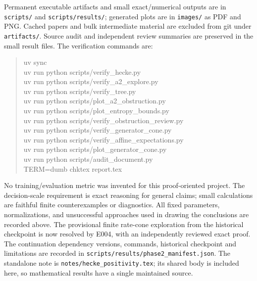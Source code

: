 \documentclass[11pt]{article}
\theoremstyle{remark}\newtheorem{remark}[definition]{Remark}
\begin{document}
Permanent executable artifacts and small exact/numerical outputs are in
\texttt{scripts/} and \texttt{scripts/results/}; generated plots are in
\texttt{images/} as PDF and PNG. Cached papers and bulk intermediate
material are excluded from git under \texttt{artifacts/}. Source audit and
independent review summaries are preserved in the small result files.
The verification commands are:
\begin{quote}\small\ttfamily
uv sync\\
uv run python scripts/verify\_hecke.py\\
uv run python scripts/verify\_a2\_explore.py\\
uv run python scripts/verify\_tree.py\\
uv run python scripts/plot\_a2\_obstruction.py\\
uv run python scripts/plot\_entropy\_bounds.py\\
uv run python scripts/verify\_obstruction\_review.py\\
uv run python scripts/verify\_generator\_cone.py\\
uv run python scripts/verify\_affine\_expectations.py\\
uv run python scripts/plot\_generator\_cone.py\\
uv run python scripts/audit\_document.py\\
TERM=dumb chktex report.tex
\end{quote}
No training/evaluation metric was invented for this proof-oriented project.
The decision-scale requirement is exact reasoning for general claims;
small calculations are faithful finite counterexamples or diagnostics.
All fixed parameters, normalizations, and unsuccessful approaches used in
drawing the conclusions are recorded above. The provisional finite rate-cone
exploration from the historical checkpoint is now resolved by E004, with
an independently reviewed exact proof.
The continuation dependency versions, commands, historical checkpoint and
limitations are recorded in \texttt{scripts/results/phase2\_manifest.json}.
The standalone note is \texttt{notes/hecke\_positivity.tex}; its shared body
is included here, so mathematical results have a single maintained source.



\end{document}
